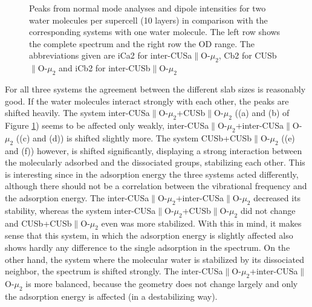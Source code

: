 \documentclass[11pt,DIV=13,BCOR=5mm,a4paper,headinclude]{scrbook}
\begin{document}
\begin{figure}[!h]
             \quad
{}
\caption{Peaks from normal mode analyses and dipole intensities for two water molecules per supercell (10 layers) in comparison with the corresponding systems with one water molecule.
The left row shows the complete spectrum and the right row the OD range.
The abbreviations given are iCa2 for inter-CUSa$\parallel$O-$\mu_2$, Cb2 for CUSb$\parallel$O-$\mu_2$ and iCb2 for inter-CUSb$\parallel$O-$\mu_2$}
            \label{abb:2water_comp}
\end{figure}
For all three systems the agreement between the different slab sizes is reasonably good.
If the water molecules interact strongly with each other, the peaks are shifted heavily.
The system inter-CUSa$\parallel$O-$\mu_2$+CUSb$\parallel$O-$\mu_2$ ((a) and (b) of Figure \ref{abb:2water_comp}) seems to be affected only weakly, inter-CUSa$\parallel$O-$\mu_2$+inter-CUSa$\parallel$O-$\mu_2$ ((c) and (d)) is shifted slightly more.
The system CUSb+CUSb$\parallel$O-$\mu_2$ ((e) and (f)) however, is shifted  significantly, displaying a strong interaction between the molecularly adsorbed and the dissociated groups, stabilizing each other.
This is interesting since in the adsorption energy the three systems acted differently, although there should not be a correlation between the vibrational frequency and the adsorption energy.
The inter-CUSa$\parallel$O-$\mu_2$+inter-CUSa$\parallel$O-$\mu_2$ decreased its stability, whereas the system inter-CUSa$\parallel$O-$\mu_2$+CUSb$\parallel$O-$\mu_2$ did not change and CUSb+CUSb$\parallel$O-$\mu_2$ even was more stabilized.
With this in mind, it makes sense that this system, in which the adsorption energy is slightly affected also shows hardly any difference to the single adsorption in the spectrum.
On the other hand, the system where the molecular water is stabilized by its dissociated neighbor, the spectrum is shifted strongly.
The inter-CUSa$\parallel$O-$\mu_2$+inter-CUSa$\parallel$O-$\mu_2$ is more balanced, because the geometry does not change largely and only the adsorption energy is affected (in a destabilizing way).
\end{document}
